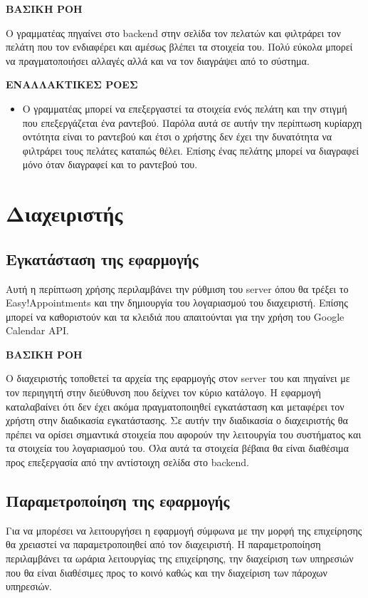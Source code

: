 \textbf{ΒΑΣΙΚΗ ΡΟΗ}

Ο γραμματέας πηγαίνει στο backend στην σελίδα τον πελατών και φιλτράρει τον πελάτη που τον ενδιαφέρει και αμέσως βλέπει τα στοιχεία του. Πολύ εύκολα μπορεί να πραγματοποιήσει αλλαγές αλλά και να τον διαγράψει από το σύστημα. 

\textbf{ΕΝΑΛΛΑΚΤΙΚΕΣ ΡΟΕΣ}

\begin{itemize}
\item Ο γραμματέας μπορεί να επεξεργαστεί τα στοιχεία ενός πελάτη και την στιγμή που επεξεργάζεται ένα ραντεβού. Παρόλα αυτά σε αυτήν την περίπτωση κυρίαρχη οντότητα είναι το ραντεβού και έτσι ο χρήστης δεν έχει την δυνατότητα να φιλτράρει τους πελάτες καταπώς θέλει. Επίσης ένας πελάτης μπορεί να διαγραφεί μόνο όταν διαγραφεί και το ραντεβού του.
\end{itemize}

\section{Διαχειριστής}
\subsection{Εγκατάσταση της εφαρμογής}
Αυτή η περίπτωση χρήσης περιλαμβάνει την ρύθμιση του server όπου θα τρέξει το Easy!Appointments και την δημιουργία του λογαριασμού του διαχειριστή. Επίσης μπορεί να καθοριστούν και τα κλειδιά που απαιτούνται για την χρήση του Google Calendar API.

\textbf{ΒΑΣΙΚΗ ΡΟΗ} 

Ο διαχειριστής τοποθετεί τα αρχεία της εφαρμογής στον server του και πηγαίνει με τον περιηγητή στην διεύθυνση που δείχνει τον κύριο κατάλογο. Η εφαρμογή καταλαβαίνει ότι δεν έχει ακόμα πραγματοποιηθεί εγκατάσταση και μεταφέρει τον χρήστη στην διαδικασία εγκατάστασης. Σε αυτήν την διαδικασία ο διαχειριστής θα πρέπει να ορίσει σημαντικά στοιχεία που αφορούν την λειτουργία του συστήματος και τα στοιχεία του λογαριασμού του. Όλα αυτά τα στοιχεία βέβαια θα είναι διαθέσιμα προς επεξεργασία από την αντίστοιχη σελίδα στο backend.

\subsection{Παραμετροποίηση της εφαρμογής}
Για να μπορέσει να λειτουργήσει η εφαρμογή σύμφωνα με την μορφή της επιχείρησης θα χρειαστεί να παραμετροποιηθεί από τον διαχειριστή. Η παραμετροποίηση περιλαμβάνει τα ωράρια λειτουργίας της επιχείρησης, την διαχείριση των υπηρεσιών που θα είναι διαθέσιμες προς το κοινό καθώς και την διαχείριση των πάροχων υπηρεσιών.

